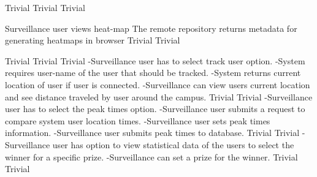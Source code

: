  		{Trivial}
    {Trivial}
    {Trivial}

\FuncReq
    {Surveillance user views heat-map}
		{The remote repository returns metadata for generating heatmaps in browser}
    {Trivial}
    {Trivial}

		{Trivial}
    {Trivial}
    {Trivial}	
		{-Surveillance user has to select track user option.
		-System requires user-name of the user that should be tracked.
		-System returns current location of user if user is connected.
		-Surveillance can view users current location and see distance traveled by user around the campus.}
    {Trivial}
    {Trivial}
		{-Surveillance user has to select the peak times option.
		-Surveillance user submits a request to compare system user location times.
		-Surveillance user sets peak times information.
		-Surveillance user submits peak times to database.}
    {Trivial}
    {Trivial}
		{-Surveillance user has option to view statistical data of the users to select the winner for a specific prize.
		 -Surveillance can set a prize for the winner.}
    {Trivial}
    {Trivial}
